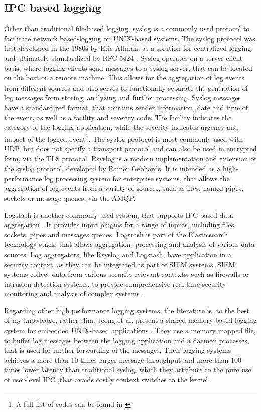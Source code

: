 \subsection{IPC based logging} \label{sec:ipc_logging}
Other than traditional file-based logging, syslog is a commonly used protocol to facilitate network based-logging
on UNIX-based systems. The syslog protocol was first developed in the 1980s by Eric Allman, as a solution
for centralized logging, and ultimately standardized by RFC 5424 \cite{gerhards2009}. Syslog operates on a server-client
basis, where logging clients send messages to a syslog server, that can be located on the host or a remote machine. This allows for
the aggregation of log events from different sources and also serves to functionally separate the generation of log messages from storing, analyzing
and further processing. 
Syslog messages have a standardized format, that contains sender information, date and time of the event, as well as a facility and severity code. The facility indicates
the category of the logging application, while the severity indicates urgency and impact of the logged event\footnote{A full list of codes can be found in \cite[p.10-11]{gerhards2009}}. 
The syslog protocol is most commonly used with \ac{UDP}, but does not specify a transport protocol and can also be used in 
encrypted form, via the \ac{TLS} protocol. 
Rsyslog is a modern implementation and extension of the syslog protocol, developed by Rainer Gebhards\cite{rsyslog}.
It is intended as a high-performance log processing system for enterprise systems, that allows the aggregation of log events
from a variety of sources, such as files, named pipes, sockets or message queues, via the \ac{AMQP}\cite{vinoski2006advanced}. 
\par
Logstash is another commonly used system, that supports \ac{IPC} based data aggregation \cite{logstash}. It provides input 
plugins for a range of inputs, including files, sockets, pipes and messages queues. Logstash is part of the Elasticsearch technology stack, that allows 
aggregation, processing and analysis of various data sources. Log aggregators, like Rsyslog and Logstash, have application in a security context,
as they can be integrated as part of \ac{SIEM} systems. \ac{SIEM} systems collect data from various security relevant contexts, such as firewalls or intrusion detection 
systems, to provide comprehensive real-time security monitoring and analysis of complex systems \cite{bhatt2014operational}.
\par
Regarding other high performance logging systems, the literature is, to the best of my knowledge, rather slim.
Jeong et al. present a shared memory based logging system for embedded UNIX-based applications \cite{jeong2013high}.
They use a memory mapped file, to buffer log messages between the logging application and a daemon processes, that is used for further forwarding of the messages.
Their logging systems achieves a more than 10 times larger message throughput and more than 100 times lower latency than traditional syslog, which they attribute 
to the pure use of user-level \ac{IPC} ,that avoids costly context switches to the kernel. 


